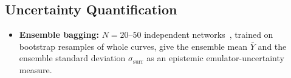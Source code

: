 \subsection{Uncertainty Quantification}
\label{sec:uncertainty}

\begin{itemize}
  \item \textbf{Ensemble bagging:} $N = 20$--$50$ independent networks~\citep{Breiman1996_Bagging}, trained on bootstrap resamples of whole curves, give the ensemble mean $\bar{Y}$ and the ensemble standard deviation $\sigma_{\mathrm{surr}}$ as an epistemic emulator-uncertainty measure.
\end{itemize}
